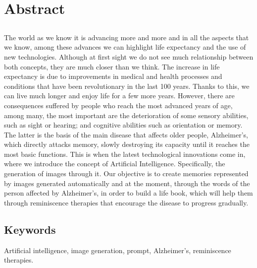 \chapter*{Abstract}
\section*{\tituloPortadaEngVal}
\renewcommand{\baselinestretch}{1.5}
The world as we know it is advancing more and more and in all the aspects that we know, among these advances we can highlight life expectancy and the use of new technologies. Although at first sight we do not see much relationship between both concepts, they are much closer than we think. The increase in life expectancy is due to improvements in medical and health processes and conditions that have been revolutionary in the last 100 years. Thanks to this, we can live much longer and enjoy life for a few more years. However, there are consequences suffered by people who reach the most advanced years of age, among many, the most important are the deterioration of some sensory abilities, such as sight or hearing; and cognitive abilities such as orientation or memory. The latter is the basis of the main disease that affects older people, Alzheimer's, which directly attacks memory, slowly destroying its capacity until it reaches the most basic functions. This is when the latest technological innovations come in, where we introduce the concept of Artificial Intelligence. Specifically, the generation of images through it. Our objective is to create memories represented by images generated automatically and at the moment, through the words of the person affected by Alzheimer's, in order to build a life book, which will help them through reminiscence therapies that encourage the disease to progress gradually.


\section*{Keywords}

\noindent Artificial intelligence, image generation, prompt, Alzheimer's, reminiscence therapies.



